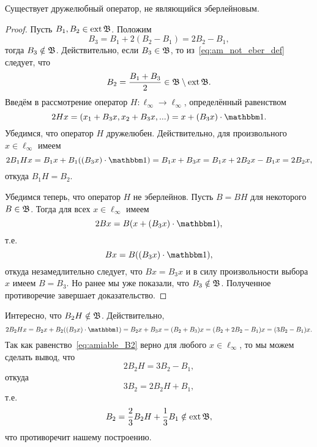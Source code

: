 \begin{theorem}
	\label{thm:amiable_but_not_Eberlein_exists}
	Существует дружелюбный оператор, не являющийся эберлейновым.
\end{theorem}

\begin{proof}
	Пусть $B_1, B_2 \in \operatorname{ext} \mathfrak{B}$.
	Положим
	\begin{equation}
		\label{eq:am_not_eber_def}
		B_3 = B_1 + 2(B_2-B_1) = 2B_2-B_1,
	\end{equation}
	тогда $B_3 \notin \mathfrak{B}$.
	Действительно, если $B_3 \in \mathfrak{B}$, то из~\eqref{eq:am_not_eber_def} следует, что
	\begin{equation}
		B_2 = \frac{B_1 + B_3}2 \in \mathfrak{B} \setminus \operatorname{ext} \mathfrak{B}
		.
	\end{equation}
	Введём в рассмотрение оператор $H:\ell_\infty\to\ell_\infty$, определённый равенством
	\begin{equation}
		2Hx = (x_1 + B_3x, x_2 + B_3x, ...) = x + (B_3 x) \cdot \one
		.
	\end{equation}
	Убедимся, что оператор $H$ дружелюбен.
	Действительно, для произвольного $x\in\ell_\infty$ имеем
	\begin{equation}
		2 B_1 H x = B_1 x + B_1 ((B_3 x) \cdot\one) = B_1 x + B_3 x =
		B_1 x + 2 B_2 x - B_1 x = 2B_2 x
		,
	\end{equation}
	откуда $B_1 H = B_2$.

	Убедимся теперь, что оператор $H$ не эберлейнов.
	Пусть $B = BH$ для некоторого $B\in\mathfrak{B}$.
	Тогда для всех $x\in\ell_\infty$ имеем
	\begin{equation}
		2Bx = B (x + (B_3 x) \cdot \one)
		,
	\end{equation}
	т.е.
	\begin{equation}
		Bx =  B((B_3 x) \cdot \one)
		,
	\end{equation}
	откуда незамедлительно следует, что $Bx = B_3x$ и в силу произвольности выбора $x$ имеем $B=B_3$.
	Но ранее мы уже показали, что $B_3\notin \mathfrak{B}$.
	Полученное противоречие завершает доказательство.
\end{proof}

\begin{remark}
	Интересно, что $B_2H\notin \mathfrak{B}$.
	Действительно,
	\begin{equation}
		\label{eq:amiable_B2}
		2B_2 H x = B_2 x + B_2((B_3 x)\cdot \one) = B_2 x + B_3 x  =
		(B_2 + B_3) x  = (B_2+2B_2-B_1)x = (3B_2-B_1)x
		.
	\end{equation}
	Так как равенство~\eqref{eq:amiable_B2} верно для любого $x\in\ell_\infty$,
	то мы можем сделать вывод, что
	\begin{equation}
		2B_2H = 3B_2-B_1
		,
	\end{equation}
	откуда
	\begin{equation}
		3B_2 = 2B_2H  + B_1
		,
	\end{equation}
	т.е.
	\begin{equation}
		B_2 = \frac23 B_2H  + \frac13 B_1 \notin \operatorname{ext}\mathfrak{B}
		,
	\end{equation}
	что противоречит нашему построению.
\end{remark}

